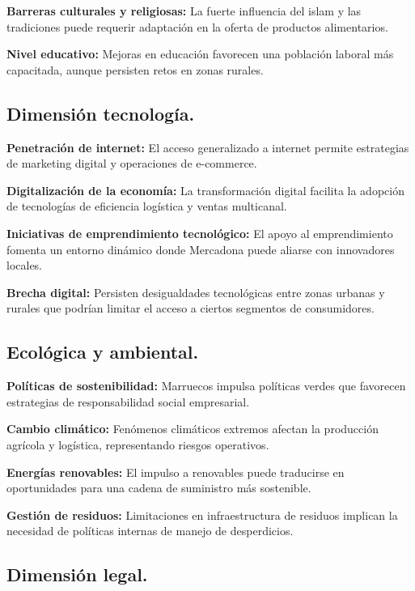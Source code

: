 \documentclass{article}  %
\begin{document}
\textbf{Barreras culturales y religiosas:} La fuerte influencia del
islam y las tradiciones puede requerir adaptación en la oferta de
productos alimentarios.

\textbf{Nivel educativo:} Mejoras en educación favorecen una población
laboral más capacitada, aunque persisten retos en zonas rurales.

\subsection{Dimensión tecnología.}\label{dimensiuxf3n-tecnologuxeda.}

\textbf{Penetración de internet:} El acceso generalizado a internet
permite estrategias de marketing digital y operaciones de e-commerce.

\textbf{Digitalización de la economía:} La transformación digital
facilita la adopción de tecnologías de eficiencia logística y ventas
multicanal.

\textbf{Iniciativas de emprendimiento tecnológico:} El apoyo al
emprendimiento fomenta un entorno dinámico donde Mercadona puede aliarse
con innovadores locales.

\textbf{Brecha digital:} Persisten desigualdades tecnológicas entre
zonas urbanas y rurales que podrían limitar el acceso a ciertos
segmentos de consumidores.

\subsection{Ecológica y ambiental.}\label{ecoluxf3gica-y-ambiental.}

\textbf{Políticas de sostenibilidad:} Marruecos impulsa políticas verdes
que favorecen estrategias de responsabilidad social empresarial.

\textbf{Cambio climático:} Fenómenos climáticos extremos afectan la
producción agrícola y logística, representando riesgos operativos.

\textbf{Energías renovables:} El impulso a renovables puede traducirse
en oportunidades para una cadena de suministro más sostenible.

\textbf{Gestión de residuos:} Limitaciones en infraestructura de
residuos implican la necesidad de políticas internas de manejo de
desperdicios.

\subsection{Dimensión legal.}\label{dimensiuxf3n-legal.}
\end{document}
